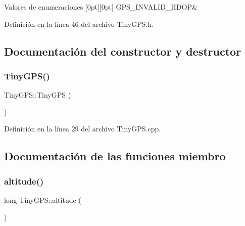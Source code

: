 \begin{DoxyEnumFields}{Valores de enumeraciones}
[0pt][0pt]{}\mbox{\label{class_tiny_g_p_s_adefa8554723aa8802edacd6094366f6fa095bfdc8e38a31c6e1796bd58323b346}} 
G\+P\+S\+\_\+\+I\+N\+V\+A\+L\+I\+D\+\_\+\+H\+D\+OP&\\
\hline

\end{DoxyEnumFields}


Definición en la línea 46 del archivo Tiny\+G\+P\+S.\+h.



\subsection{Documentación del constructor y destructor}
\mbox{\label{class_tiny_g_p_s_a588e9c23a20a6dfb6289b75408edde9f}} 
\subsubsection{\texorpdfstring{Tiny\+G\+P\+S()}{TinyGPS()}}
{\footnotesize\ttfamily Tiny\+G\+P\+S\+::\+Tiny\+G\+PS (\begin{DoxyParamCaption}{ }\end{DoxyParamCaption})}



Definición en la línea 29 del archivo Tiny\+G\+P\+S.\+cpp.



\subsection{Documentación de las funciones miembro}
\mbox{\label{class_tiny_g_p_s_ade1d05eabfb8ca0f6924ba1a8568b55c}} 
\subsubsection{\texorpdfstring{altitude()}{altitude()}}
{\footnotesize\ttfamily long Tiny\+G\+P\+S\+::altitude (\begin{DoxyParamCaption}{ }\end{DoxyParamCaption})\hspace{0.3cm}{\ttfamily [inline]}}




